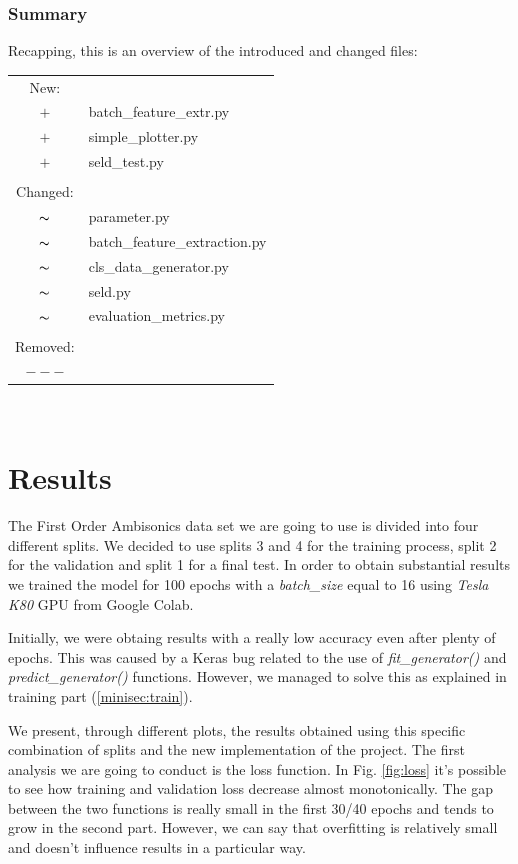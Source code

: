 \documentclass[11pt]{article}
\begin{document}
\subsubsection{Summary}

Recapping, this is an overview of the introduced and changed files:

\begin{tabular}{cp{}}
  New:\\  
  $+$ & batch\_feature\_extr.py \\
  $+$ & simple\_plotter.py \\
  $+$ & seld\_test.py \\
  \\
  Changed:\\
  $\thicksim$ & parameter.py\\
  $\thicksim$ & batch\_feature\_extraction.py\\
  $\thicksim$ & cls\_data\_generator.py\\
  $\thicksim$ & seld.py\\
  $\thicksim$ & evaluation\_metrics.py\\
  \\
  Removed:\\
  $---$ 
\end{tabular}\\


\newpage
\section{Results}\label{cha:res}

The First Order Ambisonics data set we are going to use is divided into four different splits. We decided to use splits 3 and 4 for the training process, split 2 for the validation and split 1 for a final test. In order to obtain substantial results we trained the model for 100 epochs with a \textit{batch\_size} equal to 16 using \textit{Tesla K80} GPU from Google Colab.

\noindent
Initially, we were obtaing results with a really low accuracy even after plenty of epochs. This was caused by a Keras bug related to the use of \textit{fit\_generator()} and \textit{predict\_generator()} functions. However, we managed to solve this as explained in training part (\ref{minisec:train}). 

\noindent
We present, through different plots, the results obtained using this specific combination of splits and the new implementation of the project. The first analysis we are going to conduct is the loss function. In Fig. \ref{fig:loss} it's possible to see how training and validation loss decrease almost monotonically. The gap between the two functions is really small in the first 30/40 epochs and tends to grow in the second part. However, we can say that overfitting is relatively small and doesn't influence results in a particular way.
\end{document}
